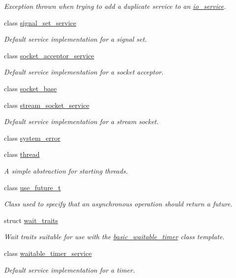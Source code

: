 \begin{DoxyCompactItemize}
\begin{DoxyCompactList}\small\item\em Exception thrown when trying to add a duplicate service to an \hyperlink{classasio_1_1io__service}{io\+\_\+service}. \end{DoxyCompactList}\item 
class \hyperlink{classasio_1_1signal__set__service}{signal\+\_\+set\+\_\+service}
\begin{DoxyCompactList}\small\item\em Default service implementation for a signal set. \end{DoxyCompactList}\item 
class \hyperlink{classasio_1_1socket__acceptor__service}{socket\+\_\+acceptor\+\_\+service}
\begin{DoxyCompactList}\small\item\em Default service implementation for a socket acceptor. \end{DoxyCompactList}\item 
class \hyperlink{classasio_1_1socket__base}{socket\+\_\+base}
\item 
class \hyperlink{classasio_1_1stream__socket__service}{stream\+\_\+socket\+\_\+service}
\begin{DoxyCompactList}\small\item\em Default service implementation for a stream socket. \end{DoxyCompactList}\item 
class \hyperlink{classasio_1_1system__error}{system\+\_\+error}
\item 
class \hyperlink{classasio_1_1thread}{thread}
\begin{DoxyCompactList}\small\item\em A simple abstraction for starting threads. \end{DoxyCompactList}\item 
class \hyperlink{classasio_1_1use__future__t}{use\+\_\+future\+\_\+t}
\begin{DoxyCompactList}\small\item\em Class used to specify that an asynchronous operation should return a future. \end{DoxyCompactList}\item 
struct \hyperlink{structasio_1_1wait__traits}{wait\+\_\+traits}
\begin{DoxyCompactList}\small\item\em Wait traits suitable for use with the \hyperlink{classasio_1_1basic__waitable__timer}{basic\+\_\+waitable\+\_\+timer} class template. \end{DoxyCompactList}\item 
class \hyperlink{classasio_1_1waitable__timer__service}{waitable\+\_\+timer\+\_\+service}
\begin{DoxyCompactList}\small\item\em Default service implementation for a timer. \end{DoxyCompactList}\end{DoxyCompactItemize}

